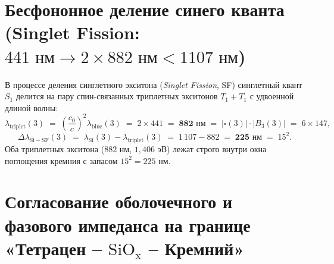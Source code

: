 \section{Бесфононное деление синего кванта (Singlet Fission: \texorpdfstring{$441\text{ нм} \to 2 \times 882\text{ нм} < 1107\text{ нм}$}{441 nm -> 2 x 882 nm < 1107 nm})}

В процессе деления синглетного экситона (\emph{Singlet Fission}, SF) синглетный квант $S_1$ делится на пару спин-связанных триплетных экситонов $T_1 + T_1$ с удвоенной длиной волны:
\begin{equation}
  \label{eq:lab-sf-882}
  \lambda_{\mathrm{triplet}}(3) \;=\; \left(\frac{c_0}{c}\right)^2 \lambda_{\mathrm{blue}}(3) \;=\; 2 \times 441 \;=\; \mathbf{882\text{ нм}} \;=\; |\square(3)|\cdot |B_3(3)| \;=\; 6 \times 147,
\end{equation}
\begin{equation}
  \label{eq:lab-sf-margin}
  \Delta\lambda_{\mathrm{Si - SF}}(3) \;=\; \lambda_{\mathrm{Si}}(3) - \lambda_{\mathrm{triplet}}(3) \;=\; 1\,107 - 882 \;=\; \mathbf{225\text{ нм}} \;=\; 15^2.
\end{equation}
Оба триплетных экситона ($882\text{ нм}$, $1{,}406\text{ эВ}$) лежат строго внутри окна поглощения кремния с запасом $15^2 = 225\text{ нм}$.

\section{Согласование оболочечного и фазового импеданса на границе «Тетрацен -- \texorpdfstring{$\mathrm{SiO_x}$}{SiOx} -- Кремний»}

